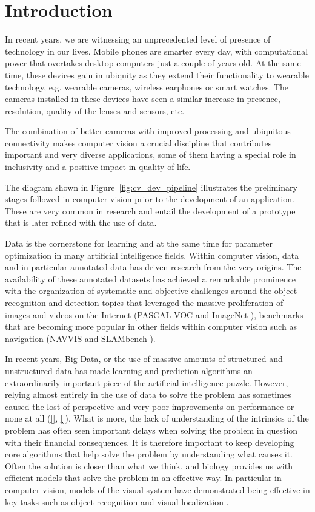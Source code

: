 \chapter{Introduction}\label{ch:introduction}

In recent years, we are witnessing an unprecedented level of presence of technology in our lives. Mobile phones are smarter every day, with computational power that overtakes desktop computers just a couple of years old. At the same time, these devices gain in ubiquity as they extend their functionality to wearable technology, e.g. wearable cameras, wireless earphones or smart watches. The cameras installed in these devices have seen a similar increase in presence, resolution, quality of the lenses and sensors, etc.

The combination of better cameras with improved processing and ubiquitous connectivity makes computer vision a crucial discipline that contributes important and very diverse applications, some of them having a special role in inclusivity and a positive impact in quality of life.

The diagram shown in Figure~\ref{fig:cv_dev_pipeline} illustrates the preliminary stages followed in computer vision prior to the development of an application. These are very common in research and entail the development of a prototype that is later refined with the use of data. 

Data is the cornerstone for learning and at the same time for parameter optimization in many artificial intelligence fields. Within computer vision, data and in particular annotated data has driven research from the very origins. The availability of these annotated datasets has achieved a remarkable prominence with the organization of systematic and objective challenges around the object recognition and detection topics that leveraged the massive proliferation of images and videos on the Internet (PASCAL VOC \citep{} and ImageNet \citep{}), benchmarks that are becoming  more popular in other fields within computer vision such as navigation (NAVVIS \cite{} and SLAMbench \cite{}).

In recent years, Big Data, or the use of massive amounts of structured and unstructured data has made learning and prediction algorithms an extraordinarily important piece of the artificial intelligence puzzle. However, relying almost entirely in the use of data to solve the problem has sometimes caused the lost of perspective and very poor improvements on performance or none at all (\ref{}, \ref{}). What is more, the lack of understanding of the intrinsics of the problem has often seen important delays when solving the problem in question with their financial consequences. It is therefore important to keep developing core algorithms that help solve the problem by understanding what causes it. Often the solution is closer than what we think, and biology provides us with efficient models that solve the problem in an effective way. In particular in computer vision, models of the visual system have demonstrated being effective in key tasks such as object recognition and visual localization \cite{}. 


